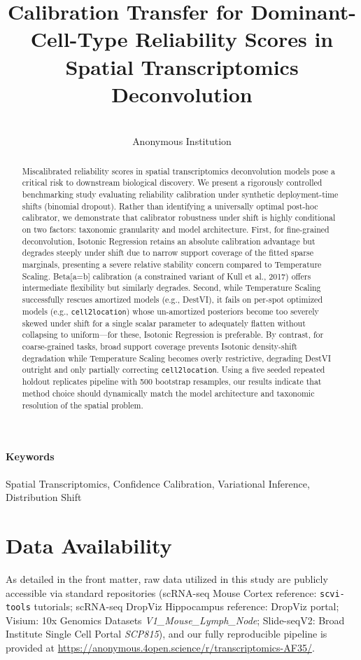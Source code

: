 \documentclass{jmlr} %
\title{Calibration Transfer for Dominant-Cell-Type Reliability Scores in Spatial Transcriptomics Deconvolution}
\author{\Name{Anonymous Authors} \Email{anonymous@example.com} \\
      \addr Anonymous Institution}
\begin{document}
\maketitle

\begin{abstract}
Miscalibrated reliability scores in spatial transcriptomics deconvolution models pose a critical risk to downstream biological discovery. We present a rigorously controlled benchmarking study evaluating reliability calibration under synthetic deployment-time shifts (binomial dropout). Rather than identifying a universally optimal post-hoc calibrator, we demonstrate that calibrator robustness under shift is highly conditional on two factors: taxonomic granularity and model architecture. First, for fine-grained deconvolution, Isotonic Regression retains an absolute calibration advantage but degrades steeply under shift due to narrow support coverage of the fitted sparse marginals, presenting a severe relative stability concern compared to Temperature Scaling. Beta[a=b] calibration (a constrained variant of Kull et al., 2017) offers intermediate flexibility but similarly degrades. Second, while Temperature Scaling successfully rescues amortized models (e.g., DestVI), it fails on per-spot optimized models (e.g., \texttt{cell2location}) whose un-amortized posteriors become too severely skewed under shift for a single scalar parameter to adequately flatten without collapsing to uniform---for these, Isotonic Regression is preferable. By contrast, for coarse-grained tasks, broad support coverage prevents Isotonic density-shift degradation while Temperature Scaling becomes overly restrictive, degrading DestVI outright and only partially correcting \texttt{cell2location}. Using a five seeded repeated holdout replicates pipeline with 500 bootstrap resamples, our results indicate that method choice should dynamically match the model architecture and taxonomic resolution of the spatial problem.
\end{abstract}

\paragraph*{Keywords}
Spatial Transcriptomics, Confidence Calibration, Variational Inference, Distribution Shift

\section{Data Availability}
As detailed in the front matter, raw data utilized in this study are publicly accessible via standard repositories (scRNA-seq Mouse Cortex reference: \texttt{scvi-tools} tutorials; scRNA-seq DropViz Hippocampus reference: DropViz portal; Visium: 10x Genomics Datasets \textit{V1\_Mouse\_Lymph\_Node}; Slide-seqV2: Broad Institute Single Cell Portal \textit{SCP815}), and our fully reproducible pipeline is provided at \url{https://anonymous.4open.science/r/transcriptomics-AF35/}.
\end{document}
